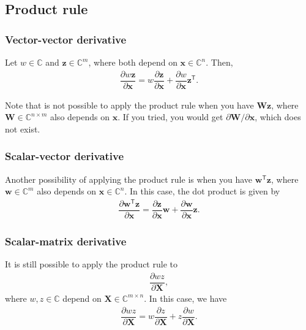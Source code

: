 \documentclass{article}
\newcommand{\trans}{\mathsf{T}}
\begin{document}
\subsection{Product rule}
\subsubsection{Vector-vector derivative}
Let \(w \in \mathbb{C}\) and \(\mathbf{z} \in \mathbb{C}^{m}\), where both depend on \(\mathbf{x} \in \mathbb{C}^{n}\). Then,
\begin{align}
    \dfrac{\partial w \mathbf{z}}{\partial \mathbf{x}} = w \dfrac{\partial \mathbf{z}}{\partial \mathbf{x}} + \dfrac{\partial w}{\partial \mathbf{x}} \mathbf{z}^\trans.
\end{align}

Note that is not possible to apply the product rule when you have \(\mathbf{Wz}\), where \(\mathbf{W} \in \mathbb{C}^{n \times m}\) also depends on \(\mathbf{x}\). If you tried, you would get \(\partial\mathbf{W}/\partial\mathbf{x}\), which does not exist.
\subsubsection{Scalar-vector derivative}
Another possibility of applying the product rule is when you have \(\mathbf{w}^{\trans} \mathbf{z}\), where \(\mathbf{w} \in \mathbb{C}^{m}\) also depends on \(\mathbf{x} \in \mathbb{C}^{n}\). In this case, the dot product is given by
\begin{align}
    \dfrac{\partial \mathbf{w}^{\trans} \mathbf{z}}{\partial \mathbf{x}} = \dfrac{\partial \mathbf{z}}{\partial \mathbf{x}} \mathbf{w} + \dfrac{\partial \mathbf{w}}{\partial \mathbf{x}} \mathbf{z}.
\end{align}

\subsubsection{Scalar-matrix derivative}
It is still possible to apply the product rule to
\begin{align}
    \dfrac{\partial wz}{\partial \mathbf{X}},
\end{align}
where \(w,z \in \mathbb{C}\) depend on \(\mathbf{X} \in \mathbb{C}^{m \times n}\). In this case, we have
\begin{align}
    \dfrac{\partial wz}{\partial \mathbf{X}} = w \dfrac{\partial z}{\partial \mathbf{X}} + z \dfrac{\partial w}{\partial \mathbf{X}}.
\end{align}
\end{document}
